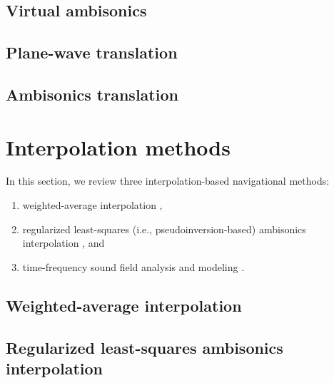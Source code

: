 \subsection{Virtual ambisonics}\label{sec:03_Navigation_Techniques:VA_Technique}


\subsection{Plane-wave translation}\label{sec:03_Navigation_Techniques:PW_Technique}


\subsection{Ambisonics translation}\label{sec:03_Navigation_Techniques:SR_Technique}


\section{Interpolation methods}\label{sec:03_Navigation_Techniques:Interpolation_Methods}
In this section, we review three interpolation-based navigational methods:
\begin{enumerate}
\item weighted-average interpolation \citep{Southern2009,MarietteKatz2009},
\item regularized least-squares (i.e., pseudoinversion-based) ambisonics interpolation \citep{Samarasinghe2014a,TylkaChoueiri2016}, and
\item time-frequency sound field analysis and modeling \citep{Thiergart2013}.
\end{enumerate}

\subsection{Weighted-average interpolation}\label{sec:03_Navigation_Techniques:XF_Technique}


\subsection{Regularized least-squares ambisonics interpolation}\label{sec:03_Navigation_Techniques:Pinv_Technique}


